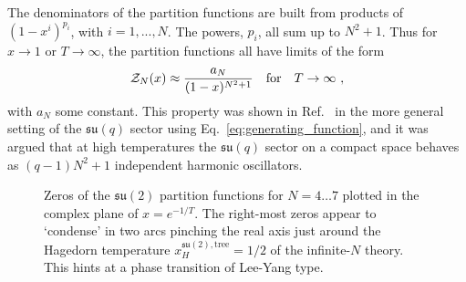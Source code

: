 \documentclass[a4paper,11pt]{article}
\begin{document}
The denominators of the partition functions are built from products of $(1-x^i)^{p_i}$, with $i=1,...,N$. The powers, $p_i$, all sum up to $N^2+1$. Thus for $x\rightarrow 1$ or $T\rightarrow \infty$, the partition functions all have limits of the form
%
\begin{equation}
	\mathcal{Z}_{N}(x) \approx \frac{a_{N}}{(1-x)^{N^2+1}} \qq{for} T\rightarrow \infty \ ,
\end{equation}
%
with $a_N$ some constant.
% 
This property was shown in Ref.\ \cite{Harmark:2014mpa} in the more general setting of the $\mathfrak{su}(q)$ sector using Eq.\ \eqref{eq:generating_function}, and it was argued that at high temperatures the $\mathfrak{su}(q)$ sector on a compact space behaves as $(q-1)N^2+1$ independent harmonic oscillators.

\begin{figure}[tp]
\begin{center}
	\caption{Zeros of the $\mathfrak{su}(2)$ partition functions for $N=4\dotsc 7$ plotted in the complex plane of $x=e^{-1/T}$. The right-most zeros appear to `condense' in two arcs pinching the real axis just around the Hagedorn temperature $x_H^{\mathfrak{su}(2),\text{tree}}=1/2$ of the infinite-$N$ theory. This hints at a phase transition of Lee-Yang type.}
	\label{fig:su(2)_zeros}
\end{center}
\end{figure}
\end{document}
